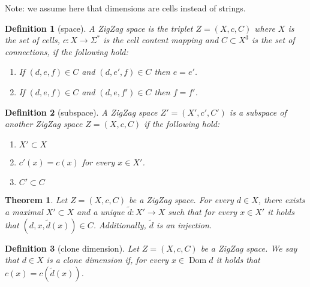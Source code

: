 \documentclass{article}
\newtheorem{Def}{Definition}
\newtheorem{The}{Theorem}[Def]
\DeclareMathOperator{\Dom}{Dom}
\newcommand{\Dim}[1]{\tilde{#1}}
\begin{document}
Note: we assume here that dimensions are cells instead of strings.

\begin{Def}[space]
A ZigZag space is the triplet $Z = (X, c, C)$ where $X$ is the set of
cells, $c : X \rightarrow \Sigma^*$ is the cell content mapping
and $C \subset X^3$ is the set of connections, if the following hold:
%
\begin{enumerate}
%
\item If $(d, e, f) \in C$ and $(d, e', f) \in C$ then $e = e'$.
%
\item If $(d, e, f) \in C$ and $(d, e, f') \in C$ then $f = f'$.
%
\end{enumerate}
\end{Def}

\begin{Def}[subspace]
A ZigZag space $Z' = (X', c', C')$ is a subspace of another ZigZag
space $Z = (X, c, C)$ if the following hold:
%
\begin{enumerate}
%
\item $X' \subset X$
%
\item $c'(x) = c(x)$ for every $x \in X'$.
%
\item $C' \subset C$
%
\end{enumerate}
\end{Def}

\begin{The}
  Let $Z = (X, c, C)$ be a ZigZag space.  For every $d \in X$, there
  exists a maximal $X' \subset X$ and a unique $\Dim{d} : X'
  \rightarrow X$ such that for every $x \in X'$ it holds that $(d, x,
  \Dim{d}(x)) \in C$.  Additionally, $\Dim{d}$ is an injection.
\end{The}

\begin{Def}[clone dimension]
  Let $Z = (X, c, C)$ be a ZigZag space.  We say that $d \in X$ is a
  clone dimension if, for every $x \in \Dom d$ it holds that $c(x) =
  c(\Dim{d}(x))$.
\end{Def}
\end{document}
